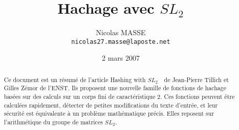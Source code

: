\documentclass[a4paper,10pt]{article}
\title{Hachage avec $SL_2$}
\author{Nicolas MASSE \\ \texttt{nicolas27.masse@laposte.net}}
\date{2 mars 2007}
\theoremstyle{break}
\begin{document}
\maketitle

\begin{abstract}
Ce document est un résumé de l'article \og Hashing with $SL_2$~\fg~de Jean-Pierre Tillich et Gilles Zémor de l'ENST.
Ils proposent une nouvelle famille de fonctions de hachage basées sur des calculs sur un corps fini de caractéristique 2.
Ces fonctions peuvent être calculées rapidement, détecter de petites modifications du texte d'entrée, et leur sécurité 
est équivalente à un problème mathématique précis. Elles reposent sur l'arithmétique du groupe de matrices $SL_2$.
\end{abstract}

\vspace{1cm}
\end{document}
